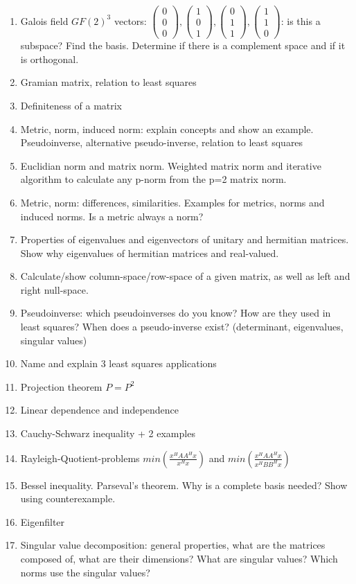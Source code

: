 \documentclass{article}
\newcommand{\icol}[1]{%
  \left(\begin{smallmatrix}#1\end{smallmatrix}\right)%
}
\begin{document}
\begin{enumerate}
    \item Galois field $GF(2)^3$ vectors: $\icol{0\\0\\0},\icol{1\\0\\1},\icol{0\\1\\1},\icol{1\\1\\0}$: is this a subspace? Find the basis. Determine if there is a complement space and if it is orthogonal.
    \item Gramian matrix, relation to least squares
    \item Definiteness of a matrix
    \item Metric, norm, induced norm: explain concepts and show an example. Pseudoinverse, alternative pseudo-inverse, relation to least squares
    \item Euclidian norm and matrix norm. Weighted matrix norm and iterative algorithm to calculate any p-norm from the p=2 matrix norm.
    \item Metric, norm: differences, similarities. Examples for metrics, norms and induced norms. Is a metric always a norm? 
    \item Properties of eigenvalues and eigenvectors of unitary and hermitian matrices. Show why eigenvalues of hermitian matrices and real-valued.
    \item Calculate/show column-space/row-space of a given matrix, as well as left and right null-space.
    \item Pseudoinverse: which pseudoinverses do you know? How are they used in least squares? When does a pseudo-inverse exist? (determinant, eigenvalues, singular values)
    \item Name and explain 3 least squares applications
    \item Projection theorem $P=P^2$
    \item Linear dependence and independence
    \item Cauchy-Schwarz inequality + 2 examples
    \item Rayleigh-Quotient-problems $min(\frac{x^HAA^Hx}{x^Hx})$ and $min(\frac{x^HAA^Hx}{x^HBB^Hx})$
    \item Bessel inequality. Parseval's theorem. Why is a complete basis needed? Show using counterexample.
    \item Eigenfilter
    \item Singular value decomposition: general properties, what are the matrices composed of, what are their dimensions? What are singular values? Which norms  use the singular values? 

\end{enumerate}
\end{document}
